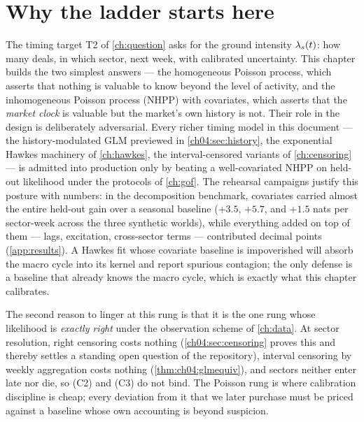 
\section{Why the ladder starts here}\label{ch04:sec:role}

The timing target T2 of \cref{ch:question} asks for the ground intensity
$\lambda_s(t)$: how many deals, in which sector, next week, with calibrated
uncertainty. This chapter builds the two simplest answers --- the
homogeneous Poisson process, which asserts that nothing is valuable to know
beyond the level of activity, and the inhomogeneous Poisson process (NHPP)
with covariates, which asserts that the \emph{market clock} is valuable but
the market's own history is not. Their role in the design is deliberately
adversarial. Every richer timing model in this document --- the
history-modulated GLM previewed in \cref{ch04:sec:history}, the exponential
Hawkes machinery of \cref{ch:hawkes}, the interval-censored variants of
\cref{ch:censoring} --- is admitted into production only by beating a
well-covariated NHPP on held-out likelihood under the protocols of
\cref{ch:gof}. The rehearsal campaigns justify this posture with numbers:
in the decomposition benchmark, covariates carried almost the entire
held-out gain over a seasonal baseline ($+3.5$, $+5.7$, and $+1.5$ nats
per sector-week across the three synthetic worlds), while everything added
on top of them --- lags, excitation, cross-sector terms --- contributed
decimal points (\cref{app:results}). A Hawkes fit whose covariate baseline
is impoverished will absorb the macro cycle into its kernel and report
spurious contagion; the only defense is a baseline that already knows the
macro cycle, which is exactly what this chapter calibrates.

The second reason to linger at this rung is that it is the one rung whose
likelihood is \emph{exactly right} under the observation scheme of
\cref{ch:data}. At sector resolution, right censoring costs nothing
(\cref{ch04:sec:censoring} proves this and thereby settles a standing open
question of the repository), interval censoring by weekly aggregation costs
nothing (\cref{thm:ch04:glmequiv}), and sectors neither enter late nor die,
so (C2) and (C3) do not bind. The Poisson rung is where calibration
discipline is cheap; every deviation from it that we later purchase must be
priced against a baseline whose own accounting is beyond suspicion.

